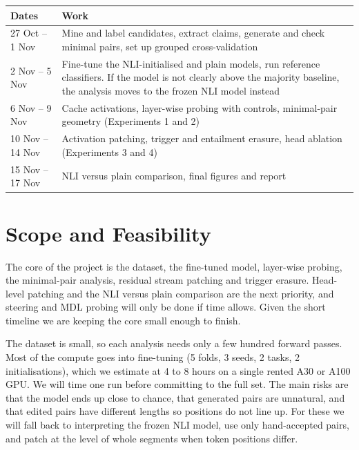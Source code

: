 \documentclass[11pt,a4paper]{article}
\begin{document}
\vspace{4pt}
\begin{tabularx}{\linewidth}{@{}l X@{}}
\toprule
Dates & Work \\
\midrule
27 Oct -- 1 Nov & Mine and label candidates, extract claims, generate and check minimal pairs, set up grouped cross-validation \\
2 Nov -- 5 Nov & Fine-tune the NLI-initialised and plain models, run reference classifiers. If the model is not clearly above the majority baseline, the analysis moves to the frozen NLI model instead \\
6 Nov -- 9 Nov & Cache activations, layer-wise probing with controls, minimal-pair geometry (Experiments 1 and 2) \\
10 Nov -- 14 Nov & Activation patching, trigger and entailment erasure, head ablation (Experiments 3 and 4) \\
15 Nov -- 17 Nov & NLI versus plain comparison, final figures and report \\
\bottomrule
\end{tabularx}

\section{Scope and Feasibility}

The core of the project is the dataset, the fine-tuned model, layer-wise probing, the minimal-pair analysis, residual stream patching and trigger erasure. Head-level patching and the NLI versus plain comparison are the next priority, and steering and MDL probing will only be done if time allows. Given the short timeline we are keeping the core small enough to finish.

The dataset is small, so each analysis needs only a few hundred forward passes. Most of the compute goes into fine-tuning (5 folds, 3 seeds, 2 tasks, 2 initialisations), which we estimate at 4 to 8 hours on a single rented A30 or A100 GPU. We will time one run before committing to the full set. The main risks are that the model ends up close to chance, that generated pairs are unnatural, and that edited pairs have different lengths so positions do not line up. For these we will fall back to interpreting the frozen NLI model, use only hand-accepted pairs, and patch at the level of whole segments when token positions differ.
\end{document}
